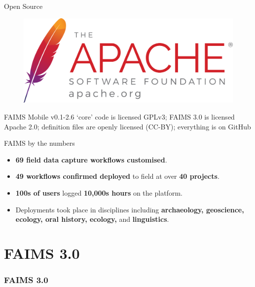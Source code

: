 \documentclass[
	aspectratio=169, %
	12pt, %
	t, %
]{beamer}
\begin{document}
\begin{refsegment}
\begin{frame}{Open Source}
 \begin{figure}[H]
    \centering
        \includegraphics[width=.65\textwidth]{figures/asf_logo_url.png}
        
        \label{fig:FAIMS-github-OSS}
 \end{figure}
 
FAIMS Mobile v0.1-2.6 `core' code is licensed GPLv3; FAIMS 3.0 is licensed Apache 2.0; definition files are openly licensed (CC-BY); everything is on GitHub 

\end{frame}


\begin{frame}{FAIMS by the numbers}
 \begin{itemize}
        \item \textbf{69 field data capture workflows customised}.
        \item \textbf{49 workflows confirmed deployed} to field at over \textbf{40 projects}.
        \item \textbf{100s of users} logged \textbf{10,000s hours} on the platform.
        \item Deployments took place in disciplines including \textbf{archaeology, geoscience, ecology, oral history, ecology, }and \textbf{linguistics}.
    \end{itemize}
\end{frame}

\section{FAIMS 3.0}

\begin{sectionframe} %
	\frametitle{FAIMS 3.0}



\end{sectionframe}
\end{refsegment}
\end{document}
